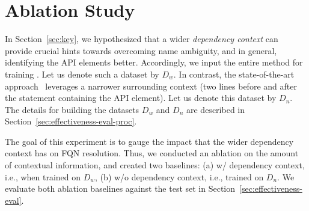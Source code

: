 \section{Ablation Study}
\label{sec:ablation}

In Section~\ref{sec:key}, we hypothesized that a wider {\em dependency context} can provide crucial hints towards overcoming name ambiguity, and in general, identifying the API elements better. Accordingly, we input the entire method for training \tool. Let us denote such a dataset by $D_w$. In contrast, the state-of-the-art approach~\cite{prompt-ase22} leverages a narrower surrounding context (two lines before and after the statement containing the API element). Let us denote this dataset by $D_n$. The details for building the datasets $D_w$ and $D_n$ are described in Section~\ref{sec:effectiveness-eval-proc}.

The goal of this experiment is to gauge the impact that the wider dependency context has on FQN resolution. Thus, we conducted an ablation on the amount of contextual information, and created two baselines: (a) \tool w/ dependency context, i.e., when trained on $D_w$, (b) \tool w/o dependency context, i.e., trained on $D_n$. We evaluate both ablation baselines against the test set in Section~\ref{sec:effectiveness-eval}.


